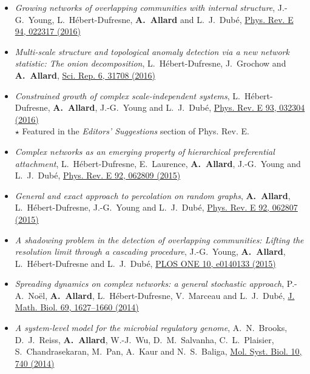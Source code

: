 \documentclass[11pt]{article}
\begin{document}
\begin{itemize}[itemsep=0.5em]
%
  \item \textit{Growing networks of overlapping communities with internal structure}, J.-G.~Young, L.~H\'ebert-Dufresne, \textbf{A.~Allard} and L.~J.~Dub\'e, \href{http://dx.doi.org/10.1103/PhysRevE.94.022317}{Phys. Rev. E 94, 022317 (2016)}
%
  \item \textit{Multi-scale structure and topological anomaly detection via a new network statistic: The onion decomposition}, L.~H\'ebert-Dufresne, J.~Grochow and \textbf{A.~Allard}, \href{http://dx.doi.org/10.1038/srep31708}{Sci. Rep. 6, 31708 (2016)}
%
  \item \textit{Constrained growth of complex scale-independent systems}, L.~H\'ebert-Dufresne, \textbf{A.~Allard}, J.-G.~Young and L.~J.~Dub\'e, \href{http://dx.doi.org/10.1103/PhysRevE.93.032304}{Phys. Rev. E 93, 032304 (2016)}\\
  {\footnotesize $\star$ Featured in the \textit{Editors' Suggestions} section of Phys. Rev. E.}
%
  \item \textit{Complex networks as an emerging property of hierarchical preferential attachment}, L.~H\'ebert-Dufresne, E.~Laurence, \textbf{A.~Allard}, J.-G.~Young and L.~J.~Dub\'e, \href{http://dx.doi.org/10.1103/PhysRevE.92.062809}{Phys. Rev. E 92, 062809 (2015)}
%
  \item \textit{General and exact approach to percolation on random graphs}, \textbf{A.~Allard}, L.~H\'ebert-Dufresne, J.-G.~Young and L.~J.~Dub\'e, \href{http://dx.doi.org/10.1103/PhysRevE.92.062807}{Phys. Rev. E 92, 062807 (2015)}
%
  \item \textit{A shadowing problem in the detection of overlapping communities: Lifting the resolution limit through a cascading procedure}, J.-G.~Young, \textbf{A.~Allard}, L.~H\'ebert-Dufresne and L.~J.~Dub\'e, \href{http://dx.doi.org/10.1371/journal.pone.0140133}{PLOS ONE 10, e0140133 (2015)}
%
  \item \textit{Spreading dynamics on complex networks: a general stochastic approach}, P.-A.~No\"el, \textbf{A.~Allard}, L.~H\'ebert-Dufresne, V.~Marceau and L.~J.~Dub\'e, \href{http://dx.doi.org/10.1007/s00285-013-0744-9}{J. Math. Biol. 69, 1627--1660 (2014)}
%
  \item \textit{A system-level model for the microbial regulatory genome}, A.~N.~Brooks, D.~J.~Reiss, \textbf{A.~Allard}, W.-J.~Wu, D.~M.~Salvanha, C.~L.~Plaisier, S.~Chandrasekaran, M.~Pan, A.~Kaur and N.~S.~Baliga, \href{http://dx.doi.org/10.15252/msb.20145160}{Mol. Syst. Biol. 10, 740 (2014)}

\end{itemize}
\end{document}
